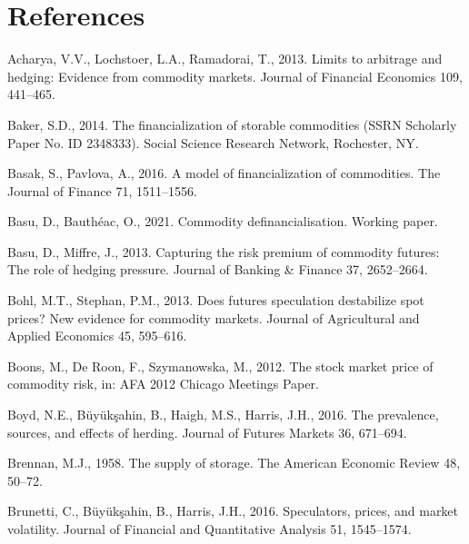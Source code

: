 \documentclass[]{elsarticle} %
\begin{document}
\cleardoublepage\restoregeometry

\hypertarget{references}{%
\section*{References}\label{references}}

\hypertarget{refs}{}
\leavevmode\hypertarget{ref-acharya_limits_2013}{}%
Acharya, V.V., Lochstoer, L.A., Ramadorai, T., 2013. Limits to arbitrage and hedging: Evidence from commodity markets. Journal of Financial Economics 109, 441--465.

\leavevmode\hypertarget{ref-baker_financialisation_2014}{}%
Baker, S.D., 2014. The financialization of storable commodities (SSRN Scholarly Paper No. ID 2348333). Social Science Research Network, Rochester, NY.

\leavevmode\hypertarget{ref-basak_model_2016}{}%
Basak, S., Pavlova, A., 2016. A model of financialization of commodities. The Journal of Finance 71, 1511--1556.

\leavevmode\hypertarget{ref-basu_definancialisation}{}%
Basu, D., Bauthéac, O., 2021. Commodity definancialisation. Working paper.

\leavevmode\hypertarget{ref-basu_capturing_2013}{}%
Basu, D., Miffre, J., 2013. Capturing the risk premium of commodity futures: The role of hedging pressure. Journal of Banking \& Finance 37, 2652--2664.

\leavevmode\hypertarget{ref-bohl_does_2013}{}%
Bohl, M.T., Stephan, P.M., 2013. Does futures speculation destabilize spot prices? New evidence for commodity markets. Journal of Agricultural and Applied Economics 45, 595--616.

\leavevmode\hypertarget{ref-boons_stock_2012}{}%
Boons, M., De Roon, F., Szymanowska, M., 2012. The stock market price of commodity risk, in: AFA 2012 Chicago Meetings Paper.

\leavevmode\hypertarget{ref-boyd_prevalence_2016}{}%
Boyd, N.E., Büyükşahin, B., Haigh, M.S., Harris, J.H., 2016. The prevalence, sources, and effects of herding. Journal of Futures Markets 36, 671--694.

\leavevmode\hypertarget{ref-brennan_supply_1958}{}%
Brennan, M.J., 1958. The supply of storage. The American Economic Review 48, 50--72.

\leavevmode\hypertarget{ref-brunetti_speculators_2016}{}%
Brunetti, C., Büyükşahin, B., Harris, J.H., 2016. Speculators, prices, and market volatility. Journal of Financial and Quantitative Analysis 51, 1545--1574.
\end{document}
